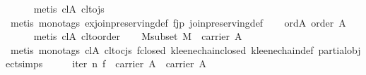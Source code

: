 \begin{isabellebody}
\ \ \ \ \isamarkupfalse%
\ {}metis\ cl{}A\ cl{}to{}js{}\isanewline
\ \ \ \ \isamarkupfalse%
\ {}metis\ {}mono{}tags{}\ ex{}join{}preserving{}def\ f{}jp\ join{}preserving{}def{}\isanewline
\isanewline
\ \ \isamarkupfalse%
\ ord{}A{}\ {}order\ A{}\isanewline
\ \ \ \ \isamarkupfalse%
\ {}metis\ cl{}A\ cl{}to{}order{}\isanewline
\isanewline
\ \ \isamarkupfalse%
\ M{}subset{}\ {}{}M\ {}\ carrier\ A{}\isanewline
\ \ \ \ \isamarkupfalse%
\ {}metis\ {}mono{}tags{}\ cl{}A\ cl{}to{}cjs\ f{}closed\ kleene{}chain{}closed\ kleene{}chain{}def\ partial{}object{}simps{}{}{}{}\isanewline
\isanewline
\ \ \isamarkupfalse%
\ \isamarkupfalse%
\ {}iter\ n\ f\ {}\ carrier\ A\ {}\ carrier\ A{}\isanewline

\end{isabellebody}

